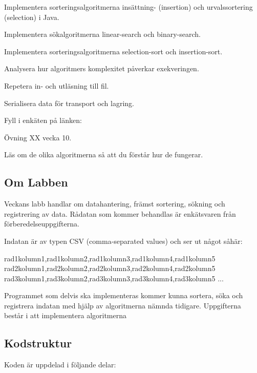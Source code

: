 

\Lab{\LabWeekTEN}

\begin{Goals}
\item Implementera sorteringsalgoritmerna insättning- (insertion) och urvalssortering (selection) i Java.
\item Implementera sökalgoritmerna linear-search och binary-search.
\item Implementera sorteringsalgoritmerna selection-sort och insertion-sort.
\item Analysera hur algoritmers komplexitet påverkar exekveringen.
\item Repetera in- och utläsning till fil.
\item Serialisera data för transport och lagring.
\end{Goals}

\begin{Preparations}
\item Fyll i enkäten på länken: %
\item Övning XX vecka 10.
\item Läs om de olika algoritmerna så att du förstår hur de fungerar.
\end{Preparations}

\subsection{Om Labben}

Veckans labb handlar om datahantering, främst sortering, sökning och registrering av data. Rådatan som kommer behandlas är enkätsvaren från förberedelseuppgifterna.

Indatan är av typen CSV (comma-separated values) och ser ut något såhär:
\begin{Code}
rad1kolumn1,rad1kolumn2,rad1kolumn3,rad1kolumn4,rad1kolumn5
rad2kolumn1,rad2kolumn2,rad2kolumn3,rad2kolumn4,rad2kolumn5
rad3kolumn1,rad3kolumn2,rad3kolumn3,rad3kolumn4,rad3kolumn5
...
\end{Code}

Programmet som delvis ska implementeras kommer kunna sortera, söka och registrera indatan med hjälp av algoritmerna nämnda tidigare. Uppgifterna består i att implementera algoritmerna

\subsection{Kodstruktur}
Koden är uppdelad i följande delar:

